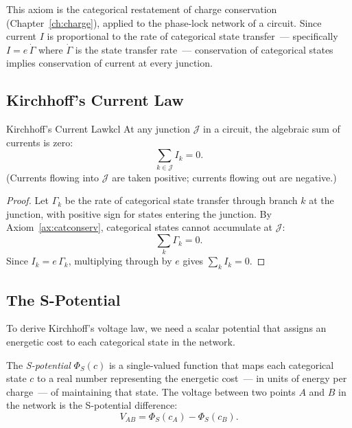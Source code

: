 This axiom is the categorical restatement of charge conservation
(Chapter~\ref{ch:charge}), applied to the phase-lock network of a circuit.
Since current $I$ is proportional to the rate of categorical state
transfer~--- specifically $I = e\,\dot{\Gamma}$ where $\dot{\Gamma}$ is
the state transfer rate~--- conservation of categorical states implies
conservation of current at every junction.

\subsection{Kirchhoff's Current Law}

\begin{consequence}{Kirchhoff's Current Law}{kcl}
At any junction $\mathcal{J}$ in a circuit, the algebraic sum of currents
is zero:
\begin{equation}
  \sum_{k \in \mathcal{J}} I_k = 0.
  \label{eq:ch18-kcl}
\end{equation}
(Currents flowing into $\mathcal{J}$ are taken positive; currents flowing
out are negative.)
\end{consequence}

\begin{proof}
Let $\Gamma_k$ be the rate of categorical state transfer through branch $k$
at the junction, with positive sign for states entering the junction.
By Axiom~\ref{ax:catconserv}, categorical states cannot accumulate at
$\mathcal{J}$:
\begin{equation}
  \sum_{k} \Gamma_k = 0.
\end{equation}
Since $I_k = e\,\Gamma_k$, multiplying through by $e$ gives
$\sum_k I_k = 0$.
\end{proof}

\subsection{The S-Potential}

To derive Kirchhoff's voltage law, we need a scalar potential that assigns
an energetic cost to each categorical state in the network.

\begin{definition}[S-Potential]
\label{def:ch18-spotential}
The \emph{S-potential} $\Phi_S(c)$ is a single-valued function that maps
each categorical state $c$ to a real number representing the energetic
cost~--- in units of energy per charge~--- of maintaining that state.  The
voltage between two points $A$ and $B$ in the network is the S-potential
difference:
\begin{equation}
  V_{AB} = \Phi_S(c_A) - \Phi_S(c_B).
  \label{eq:ch18-spotentialdiff}
\end{equation}
\end{definition}

